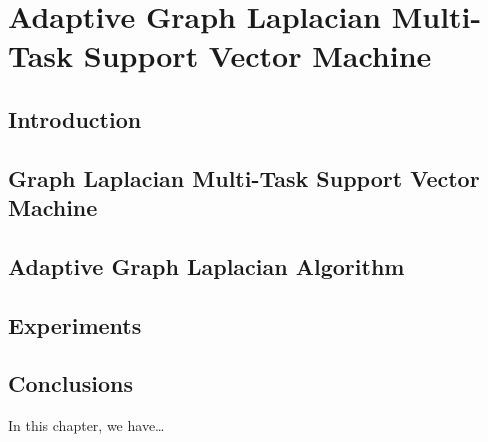 
\chapter{Adaptive Graph Laplacian Multi-Task Support Vector Machine} %
\label{Chapter3}

{\bf \small{

}}

\section{Introduction}

\section{Graph Laplacian Multi-Task Support Vector Machine}

\section{Adaptive Graph Laplacian Algorithm}

\section{Experiments}

\section{Conclusions}\label{sec-conclusions-4}

In this chapter, we have\dots
